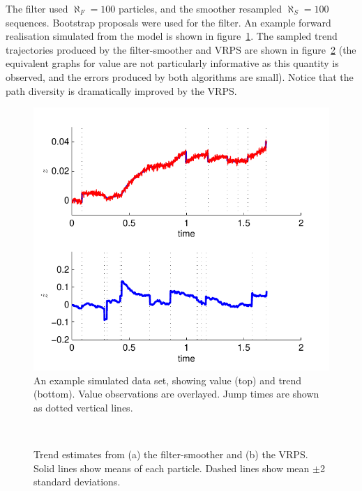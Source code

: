 \documentclass[peerreview,11pt,draftcls,onecolumn]{IEEEtran}
\begin{document}
The filter used $\aleph_F = 100$ particles, and the smoother resampled $\aleph_S = 100$ sequences. Bootstrap proposals were used for the filter. An example forward realisation simulated from the model is shown in figure~\ref{fig:example_data}. The sampled trend trajectories produced by the filter-smoother and VRPS are shown in figure~\ref{fig:example_state} (the equivalent graphs for value are not particularly informative as this quantity is observed, and the errors produced by both algorithms are small). Notice that the path diversity is dramatically improved by the VRPS.

\begin{figure}[!t]
\centering
\includegraphics[width=0.45\columnwidth]{example_data.pdf}
\caption{An example simulated data set, showing value (top) and trend (bottom). Value observations are overlayed. Jump times are shown as dotted vertical lines.}
\label{fig:example_data}
\end{figure}

\begin{figure}[!t]
\centering
{} \\
\caption{Trend estimates from (a) the filter-smoother and (b) the VRPS. Solid lines show means of each particle. Dashed lines show mean $\pm$2 standard deviations.}
\label{fig:example_state}
\end{figure}
\end{document}
